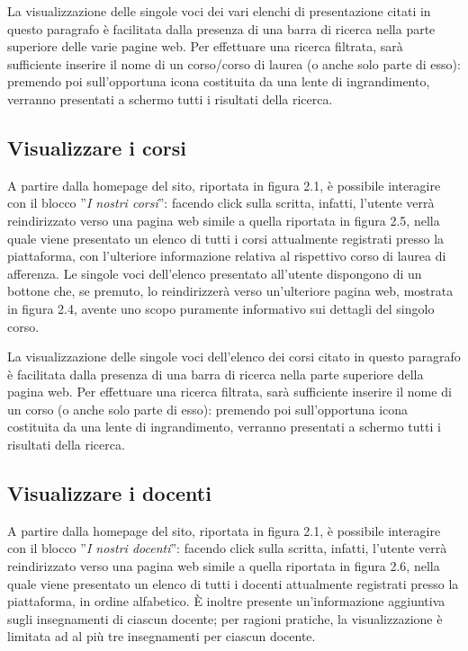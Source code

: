 \documentclass [a4paper,11pt]{book}
\begin{document}



La visualizzazione delle singole voci dei vari elenchi di presentazione citati in questo paragrafo è facilitata dalla presenza di una barra di ricerca nella parte superiore delle varie pagine web. Per effettuare una ricerca filtrata, sarà sufficiente inserire il nome di un corso/corso di laurea (o anche solo parte di esso): premendo poi sull'opportuna icona costituita da una lente di ingrandimento, verranno presentati a schermo tutti i risultati della ricerca.

\medskip

\subsection{Visualizzare i corsi}

A partire dalla homepage del sito, riportata in figura 2.1, è possibile interagire con il blocco ''\emph{I nostri corsi}'': facendo click sulla scritta, infatti, l'utente verrà reindirizzato verso una pagina web simile a quella riportata in figura 2.5, nella quale viene presentato un elenco di tutti i corsi attualmente registrati presso la piattaforma, con l'ulteriore informazione relativa al rispettivo corso di laurea di afferenza. Le singole voci dell'elenco presentato all'utente dispongono di un bottone che, se premuto, lo reindirizzerà verso un'ulteriore pagina web, mostrata in figura 2.4, avente uno scopo puramente informativo sui dettagli del singolo corso.


La visualizzazione delle singole voci dell'elenco dei corsi citato in questo paragrafo è facilitata dalla presenza di una barra di ricerca nella parte superiore della pagina web. Per effettuare una ricerca filtrata, sarà sufficiente inserire il nome di un corso (o anche solo parte di esso): premendo poi sull'opportuna icona costituita da una lente di ingrandimento, verranno presentati a schermo tutti i risultati della ricerca.

\medskip

\subsection{Visualizzare i docenti}

A partire dalla homepage del sito, riportata in figura 2.1, è possibile interagire con il blocco ''\emph{I nostri docenti}'': facendo click sulla scritta, infatti, l'utente verrà reindirizzato verso una pagina web simile a quella riportata in figura 2.6, nella quale viene presentato un elenco di tutti i docenti attualmente registrati presso la piattaforma, in ordine alfabetico. È inoltre presente un'informazione aggiuntiva sugli insegnamenti di ciascun docente; per ragioni pratiche, la visualizzazione è limitata ad al più tre insegnamenti per ciascun docente.
\end{document}

